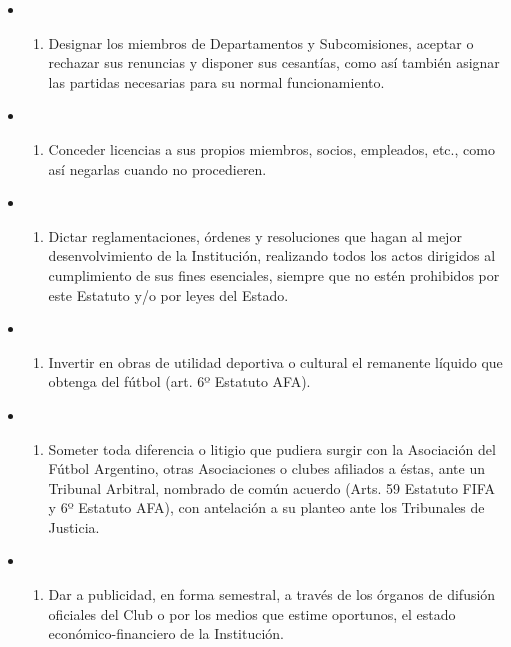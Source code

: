\documentclass[openany]{book}
\providecommand{\tightlist}{%
  \setlength{\itemsep}{0pt}\setlength{\parskip}{0pt}}
\begin{document}
\begin{itemize}
\begin{itemize}
\begin{enumerate}
    \end{enumerate}
  \item
    \begin{enumerate}
    \def\labelenumi{\alph{enumi})}
    \setcounter{enumi}{19}
    \tightlist
    \item
      Designar los miembros de Departamentos y Subcomisiones, aceptar o rechazar sus renuncias y disponer sus cesantías, como así también asignar las partidas necesarias para su normal funcionamiento.
    \end{enumerate}
  \item
    \begin{enumerate}
    \def\labelenumi{\alph{enumi})}
    \setcounter{enumi}{20}
    \tightlist
    \item
      Conceder licencias a sus propios miembros, socios, empleados, etc., como así negarlas cuando no procedieren.
    \end{enumerate}
  \item
    \begin{enumerate}
    \def\labelenumi{\alph{enumi})}
    \setcounter{enumi}{21}
    \tightlist
    \item
      Dictar reglamentaciones, órdenes y resoluciones que hagan al mejor desenvolvimiento de la Institución, realizando todos los actos dirigidos al cumplimiento de sus fines esenciales, siempre que no estén prohibidos por este Estatuto y/o por leyes del Estado.
    \end{enumerate}
  \item
    \begin{enumerate}
    \def\labelenumi{\alph{enumi})}
    \setcounter{enumi}{22}
    \tightlist
    \item
      Invertir en obras de utilidad deportiva o cultural el remanente líquido que obtenga del fútbol (art. 6º Estatuto AFA).
    \end{enumerate}
  \item
    \begin{enumerate}
    \def\labelenumi{\alph{enumi})}
    \setcounter{enumi}{23}
    \tightlist
    \item
      Someter toda diferencia o litigio que pudiera surgir con la Asociación del Fútbol Argentino, otras Asociaciones o clubes afiliados a éstas, ante un Tribunal Arbitral, nombrado de común acuerdo (Arts. 59 Estatuto FIFA y 6º Estatuto AFA), con antelación a su planteo ante los Tribunales de Justicia.
    \end{enumerate}
  \item
    \begin{enumerate}
    \def\labelenumi{\alph{enumi})}
    \setcounter{enumi}{24}
    \tightlist
    \item
      Dar a publicidad, en forma semestral, a través de los órganos de difusión oficiales del Club o por los medios que estime oportunos, el estado económico-financiero de la Institución.
    \end{enumerate}
  \end{itemize}
\end{itemize}
\end{document}
